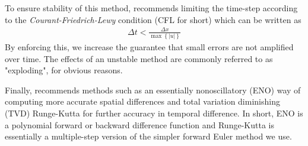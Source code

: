 To ensure stability of this method,  recommends limiting the time-step according to the \emph{Courant-Friedrich-Lewy} condition (CFL for short) which can be written as
\begin{eqnarray}
\Delta t < \frac{\Delta x}{\max \left\lbrace \left| u \right| \right\rbrace}
\end{eqnarray}
By enforcing this, we increase the guarantee that small errors are not amplified over time. The effects of an unstable method are commonly referred to as "exploding", for obvious reasons.

Finally,  recommends methods such as an essentially nonoscillatory (ENO) way of computing more accurate spatial differences and total variation diminishing (TVD) Runge-Kutta for further accuracy in temporal difference. In short, ENO is a polynomial forward or backward difference function and Runge-Kutta is essentially a multiple-step version of the simpler forward Euler method we use.



